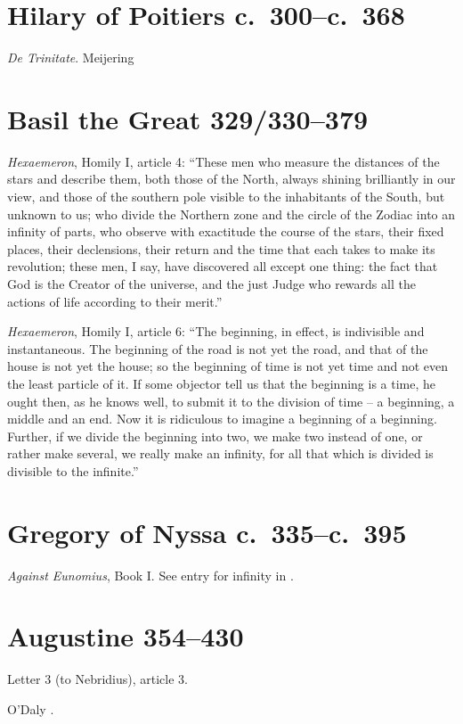 \documentclass{article}
\begin{document}
\section{Hilary of Poitiers c.~300--c.~368}
{\em De Trinitate}. Meijering \cite{meijering}

\section{Basil the Great 329/330--379}
{\em Hexaemeron}, Homily I, article 4: ``These men who measure the distances of the stars and describe them, both those of the North, always shining brilliantly in our view, and those of the southern pole visible to the inhabitants of the South, but unknown to us; who divide the Northern zone and the circle of the Zodiac into an infinity of parts, who observe with exactitude the course of the stars, their fixed places, their declensions, their return and the time that each takes to make its revolution; these men, I say, have discovered all except one thing: the fact that God is the Creator of the universe, and the just Judge who rewards all the actions of life according to their merit.''

{\em Hexaemeron}, Homily I, article 6: ``The beginning, in effect, is indivisible and instantaneous. The beginning of the road is not yet the road, and that of the house is not yet the house; so the beginning of time is not yet time and not even the least particle of it. If some objector tell us that the beginning is a time, he ought then, as he knows well, to submit it to the division of time -- a beginning, a middle and an end. Now it is ridiculous to imagine a beginning of a beginning. Further, if we divide the beginning into two, we make two instead of one, or rather make several, we really make an infinity, for all that which is divided is divisible to the infinite.''



\section{Gregory of Nyssa c.~335--c.~395}
{\em Against Eunomius}, Book I. See entry for infinity in \cite{maspero}.


\section{Augustine 354--430}
Letter 3 (to Nebridius), article 3.

O'Daly \cite[p.~157]{odaly}.
\end{document}
